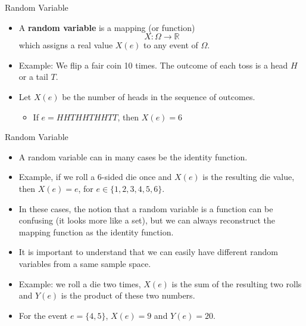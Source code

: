 \documentclass[handout]{beamer}
\begin{document}
\begin{frame}{Random Variable}
\scriptsize{

\begin{itemize}
 \item A \textbf{random variable} is a mapping (or function)
\begin{displaymath}
 X: \Omega \rightarrow \mathbb{R}
\end{displaymath}
which assigns a real value $X(e)$ to any event of $\Omega$.


\item Example: We flip a fair coin 10 times. The outcome of each toss is a head $H$ or a tail $T$.

\item  Let $X(e)$ be the number of heads in the sequence of outcomes.
\begin{itemize}
 \item If $e=HHTHHTHHTT$, then $X(e)=6$ 
\end{itemize}

\end{itemize}
}

\end{frame}


\begin{frame}{Random Variable}
\scriptsize{

\begin{itemize}
\item A random variable can in many cases be the identity function.

\item Example, if we roll a 6-sided die once and $X(e)$ is the resulting die value, then $X(e)=e$, for $e \in \{1,2,3,4,5,6\}$.

\item In these cases, the notion that a random variable is a function can be confusing (it looks more like a set), but we can always reconstruct the mapping function as the identity function.  

\item  It is important to understand that we can easily have different random variables from a same sample space. 

\item Example: we roll a die two times, $X(e)$ is the sum of the resulting two rolls and $Y(e)$ is the product of these two numbers.

\item For the event $e=\{4,5\}$, $X(e)=9$ and $Y(e)=20$.

\end{itemize}
}




\end{frame}
\end{document}
